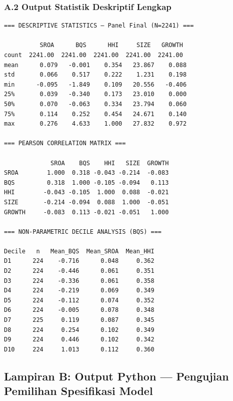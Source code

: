 \documentclass[12pt,a4paper]{article}
\begin{document}
\subsubsection{A.2 Output Statistik Deskriptif
Lengkap}\label{a.2-output-statistik-deskriptif-lengkap}

\begin{small}
\begin{verbatim}
=== DESCRIPTIVE STATISTICS — Panel Final (N=2241) ===

          SROA      BQS      HHI     SIZE   GROWTH
count  2241.00  2241.00  2241.00  2241.00  2241.00
mean      0.079   -0.001    0.354   23.867    0.088
std       0.066    0.517    0.222    1.231    0.198
min      -0.095   -1.849    0.109   20.556   -0.406
25%       0.039   -0.340    0.173   23.010    0.000
50%       0.070   -0.063    0.334   23.794    0.060
75%       0.114    0.252    0.454   24.671    0.140
max       0.276    4.633    1.000   27.832    0.972

=== PEARSON CORRELATION MATRIX ===

             SROA    BQS    HHI   SIZE  GROWTH
SROA        1.000  0.318 -0.043 -0.214  -0.083
BQS         0.318  1.000 -0.105 -0.094   0.113
HHI        -0.043 -0.105  1.000  0.088  -0.021
SIZE       -0.214 -0.094  0.088  1.000  -0.051
GROWTH     -0.083  0.113 -0.021 -0.051   1.000

=== NON-PARAMETRIC DECILE ANALYSIS (BQS) ===

Decile   n   Mean_BQS  Mean_SROA  Mean_HHI
D1      224    -0.716      0.048     0.362
D2      224    -0.446      0.061     0.351
D3      224    -0.336      0.061     0.358
D4      224    -0.219      0.069     0.349
D5      224    -0.112      0.074     0.352
D6      224    -0.005      0.078     0.348
D7      225     0.119      0.087     0.345
D8      224     0.254      0.102     0.349
D9      224     0.446      0.102     0.342
D10     224     1.013      0.112     0.360
\end{verbatim}
\end{small}

\subsection{Lampiran B: Output Python --- Pengujian Pemilihan
Spesifikasi
Model}\label{lampiran-b-output-python-pengujian-pemilihan-spesifikasi-model}
\end{document}
